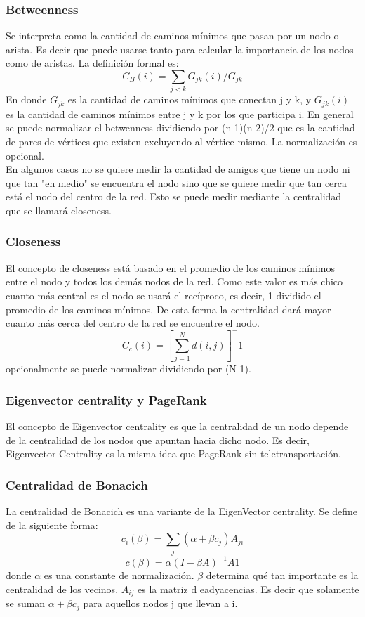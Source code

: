 \documentclass[titlepage,a4paper]{article}
\begin{document}
\subsubsection*{Betweenness}
Se interpreta como la cantidad de caminos mínimos que pasan por un nodo o arista. Es decir que puede usarse tanto para calcular la importancia de los nodos como de aristas. La definición formal es: $$C_B(i)=\sum_{j<k} G_{jk}(i)/G_{jk}$$
En donde $G_{jk}$ es la cantidad de caminos mínimos que conectan j y k, y $G_{jk}(i)$ es la cantidad de caminos mínimos entre j y k por los que participa i. En general se puede normalizar el betwenness dividiendo por (n-1)(n-2)/2 que es la cantidad de pares de vértices que existen excluyendo al vértice mismo. La normalización es opcional. \\

En algunos casos no se quiere medir la cantidad de amigos que tiene un nodo ni que tan "en medio" se encuentra el nodo sino que se quiere medir que tan cerca está el nodo del centro de la red. Esto se puede medir mediante la centralidad que se llamará closeness.

\subsubsection*{Closeness}
El concepto de closeness está basado en el promedio de los caminos mínimos entre el nodo y todos los demás nodos de la red. Como este valor es más chico cuanto más central es el nodo se usará el recíproco, es decir, 1 dividido el promedio de los caminos mínimos. De esta forma la centralidad dará mayor cuanto más cerca del centro de la red se encuentre el nodo. $$C_c(i) = [\sum_{j=1}^N d(i,j)]^-1$$ opcionalmente se puede normalizar dividiendo por (N-1). 

\subsubsection*{Eigenvector centrality y PageRank}
El concepto de Eigenvector centrality es que la centralidad de un nodo depende de la centralidad de los nodos que apuntan hacia dicho nodo. Es decir, Eigenvector Centrality es la misma idea que PageRank sin teletransportación. 

\subsubsection*{Centralidad de Bonacich}
La centralidad de Bonacich es una variante de la EigenVector centrality. Se define de la siguiente forma: $$c_i(\beta) = \sum_j(\alpha + \beta c_j) A_{ji}$$ $$c(\beta) = \alpha(I -\beta A)^{-1} A1$$
donde $\alpha$ es una constante de normalización. $\beta$ determina qué tan importante es la centralidad de los vecinos. $A_{ij}$ es la matriz d eadyacencias. Es decir que solamente se suman $\alpha +\beta c_j$ para aquellos nodos j que llevan a i. \\
\end{document}

